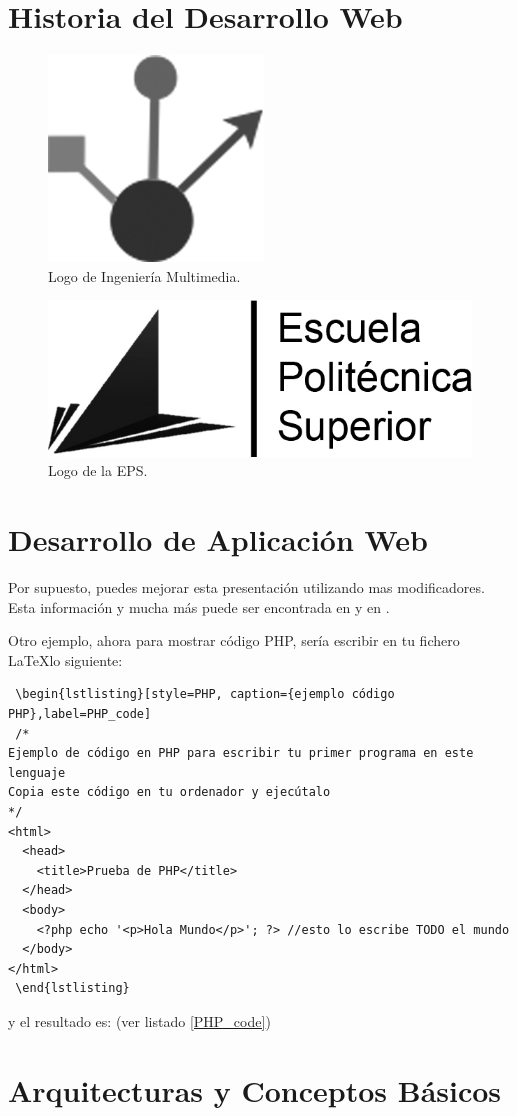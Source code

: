 \section{Historia del Desarrollo Web}


\begin{figure}
\begin{center}
\includegraphics[scale=0.25]{imagenes/logoim.jpg}
\caption{Logo de Ingeniería  Multimedia.}
\label{logo_im}
\end{center}
\end{figure}

\begin{figure}
\begin{center}
\includegraphics[scale=0.25]{imagenes/logoeps.jpg}
\caption{Logo de la EPS.}
\label{logo_eps}
\end{center}
\end{figure}

\section{Desarrollo de Aplicación Web}


Por supuesto, puedes mejorar esta presentación utilizando mas modificadores. Esta información y mucha más puede ser encontrada en \cite{listing_packagge} y en \cite{heinz1listings}.

Otro ejemplo, ahora para mostrar código PHP, sería escribir en tu fichero \LaTeX lo siguiente:
\begin{verbatim}
 \begin{lstlisting}[style=PHP, caption={ejemplo código PHP},label=PHP_code]
 /* 
Ejemplo de código en PHP para escribir tu primer programa en este lenguaje
Copia este código en tu ordenador y ejecútalo
*/
<html>
  <head>
    <title>Prueba de PHP</title>
  </head>
  <body>
    <?php echo '<p>Hola Mundo</p>'; ?> //esto lo escribe TODO el mundo
  </body>
</html>
 \end{lstlisting}
\end{verbatim}
 
 y el resultado es: (ver listado \ref{PHP_code})
 
\section{Arquitecturas y Conceptos Básicos} 